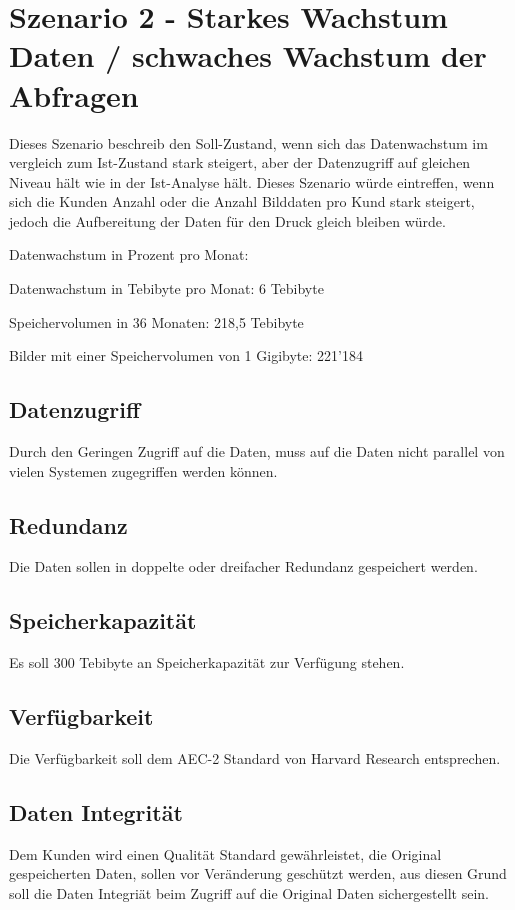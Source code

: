 \section{Szenario 2 - Starkes Wachstum Daten / schwaches Wachstum der Abfragen}
Dieses Szenario beschreib den Soll-Zustand, wenn sich das Datenwachstum im vergleich zum Ist-Zustand stark steigert, aber der Datenzugriff auf gleichen Niveau hält wie in der Ist-Analyse hält. Dieses Szenario würde eintreffen, wenn sich die Kunden Anzahl oder die Anzahl Bilddaten pro Kund stark steigert, jedoch die Aufbereitung der Daten für den Druck gleich bleiben würde.

Datenwachstum in Prozent pro Monat: 

Datenwachstum in Tebibyte pro Monat: 6 Tebibyte

Speichervolumen in 36 Monaten: 218,5 Tebibyte

Bilder mit einer Speichervolumen von 1 Gigibyte: 221'184

\subsection{Datenzugriff}
Durch den Geringen Zugriff auf die Daten, muss auf die Daten nicht parallel von vielen Systemen zugegriffen werden können.

\subsection{Redundanz}
Die Daten sollen in doppelte oder dreifacher Redundanz gespeichert werden.

\subsection{Speicherkapazität}
Es soll 300 Tebibyte an Speicherkapazität zur Verfügung stehen.

\subsection{Verfügbarkeit}
Die Verfügbarkeit soll dem AEC-2 Standard von Harvard Research entsprechen.

\subsection{Daten Integrität}
Dem Kunden wird einen Qualität Standard gewährleistet, die Original gespeicherten Daten, sollen vor Veränderung geschützt werden, aus diesen Grund soll die Daten Integriät beim Zugriff auf die Original Daten sichergestellt sein.

